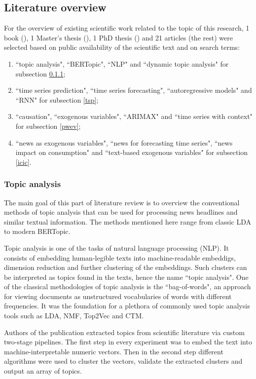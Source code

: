 \documentclass[13pt, a4paper]{article}
\begin{document}
\subsection{Literature overview}

For the overview of existing scientific work related to the topic of this research, 1 book (\cite{loughran2011liability}), 1 Master's thesis (\cite{ding2021empirical}), 1 PhD thesis (\cite{jeong2022predicting}) and 21 articles (the rest) were selected based on public availability of the scientific text and on search terms:
\begin{enumerate}
	\item ``topic analysis", ``BERTopic", ``NLP" and ``dynamic topic analysis" for subsection \ref{ta};
	\item ``time series prediction", ``time series forecasting", ``autoregressive models" and ``RNN" for subsection \ref{tsp};
	\item ``causation", ``exogenous variables", ``ARIMAX" and ``time series with context" for subsection \ref{pwev};
	\item ``news as exogenous variables", ``news for forecasting time series", ``news impact on consumption" and ``text-based exogenous variables" for subsection \ref{icic}.
\end{enumerate}

\subsubsection{Topic analysis} \label{ta}

The main goal of this part of literature review is to overview the conventional methods of topic analysis that can be used for processing news headlines and similar textual information. The methods mentioned here range from classic LDA to modern BERTopic.

Topic analysis is one of the tasks of natural language processing (NLP). It consists of embedding human-legible texts into machine-readable embeddigs, dimension reduction and further clustering of the embeddings. Such clusters can be interpreted as topics found in the texts, hence the name ``topic analysis". One of the classical methodologies of topic analysis is the ``bag-of-words", an approach for viewing documents as unstructured vocabularies of words with different frequencies. It was the foundation for a plethora of commonly used topic analysis tools such as LDA, NMF, Top2Vec and CTM.

Authors of the publication \cite{onan2019two} extracted topics from scientific literature via custom two-stage pipelines. The first step in every experiment was to embed the text into machine-interpretable numeric vectors. Then in the second step different algorithms were used to cluster the vectors, validate the extracted clusters and output an array of topics.
\end{document}
